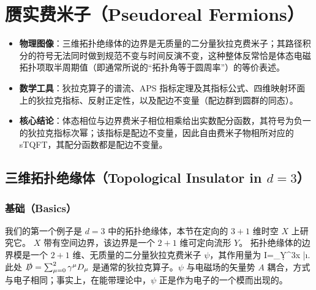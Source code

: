 
\section{赝实费米子（Pseudoreal Fermions）}\label{pseudo}

\begin{keytakeaways}
\begin{itemize}[leftmargin=1.6em,itemsep=0.2em,topsep=0.2em]
  \item \textbf{物理图像}：三维拓扑绝缘体的边界是无质量的二分量狄拉克费米子；其路径积分的符号无法同时做到规范不变与时间反演不变，这种整体反常恰是体态电磁拓扑项取半周期值（即通常所说的“拓扑角等于圆周率”）的等价表述。
  \item \textbf{数学工具}：狄拉克算子的谱流、APS 指标定理及其指标公式、四维映射环面上的狄拉克指标、反射正定性，以及配边不变量（配边群到圆群的同态）。
  \item \textbf{核心结论}：体态相位与边界费米子相位相乘给出实数配分函数，其符号为负一的狄拉克指标次幂；该指标是配边不变量，因此自由费米子物相所对应的 sTQFT，其配分函数都是配边不变量。
\end{itemize}
\end{keytakeaways}

\subsection{三维拓扑绝缘体（Topological Insulator in $d=3$）}\label{topthree}

\subsubsection{基础（Basics）}

我们的第一个例子是 $d=3$ 中的拓扑绝缘体，本节在定向的 $3+1$ 维时空 $X$ 上研究它。
$X$ 带有空间边界，该边界是一个 $2+1$ 维可定向流形 $Y$。
拓扑绝缘体的边界模是一个 $2+1$ 维、无质量的二分量狄拉克费米子 $\psi$，其作用量为
\be\label{forx}I=\int_Y\d^3x \bar\psi \i{}\psi.\ee
此处 $\slashed{D}=\sum_{\mu=0}^2\gamma^\mu D_\mu$ 是通常的狄拉克算子。$\psi$ 与电磁场的矢量势 $A$ 耦合，方式与电子相同；事实上，在能带理论中，$\psi$ 正是作为电子的一个模而出现的。

